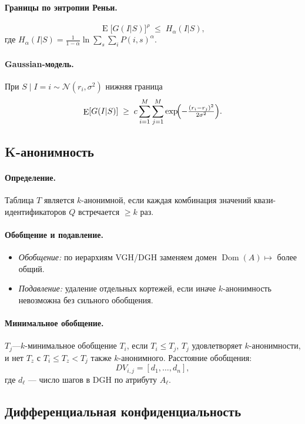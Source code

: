 \documentclass[areasetadvanced]{scrartcl}
\DeclareMathOperator{\Dom}{Dom}
\DeclareMathOperator{\E}{E}
\begin{document}
\paragraph{Границы по энтропии Реньи.}  
\[
  \E\bigl[G(I|S)\bigr]^\rho \;\le\; H_\alpha(I|S),
\]
где
\(
  H_\alpha(I|S)
  = \frac1{1-\alpha}\ln \sum_s \sum_i P(i,s)^\alpha.
\)

\paragraph{Gaussian-модель.}  
При $S\mid I=i\sim\mathcal N(r_i,\sigma^2)$ нижняя граница
\[
  \E[G(I|S)]\;\ge\;
  c\sum_{i=1}^M\sum_{j=1}^M \exp\!\Bigl(-\tfrac{(r_i-r_j)^2}{2\sigma^2}\Bigr).
\]

\subsection{K-анонимность}

\paragraph{Определение.}  
Таблица $T$ является $k$-анонимной, если каждая комбинация значений квази-идентификаторов $Q$ встречается $\ge k$ раз.

\paragraph{Обобщение и подавление.}  
\begin{itemize}
  \item \emph{Обобщение:} по иерархиям VGH/DGH заменяем домен $\Dom(A)\mapsto$ более общий.
  \item \emph{Подавление:} удаление отдельных кортежей, если иначе $k$-анонимность невозможна без сильного обобщения.
\end{itemize}

\paragraph{Минимальное обобщение.}  
$T_j$—$k$-минимальное обобщение $T_i$, если $T_i\le T_j$, $T_j$ удовлетворяет $k$-анонимности, и нет $T_z$ с $T_i\le T_z< T_j$ также $k$-анонимного. Расстояние обобщения:
\[
  DV_{i,j} = [d_1,\dots,d_n],
\]
где $d_\ell$ — число шагов в DGH по атрибуту $A_\ell$.

\subsection{Дифференциальная конфиденциальность}
\end{document}
